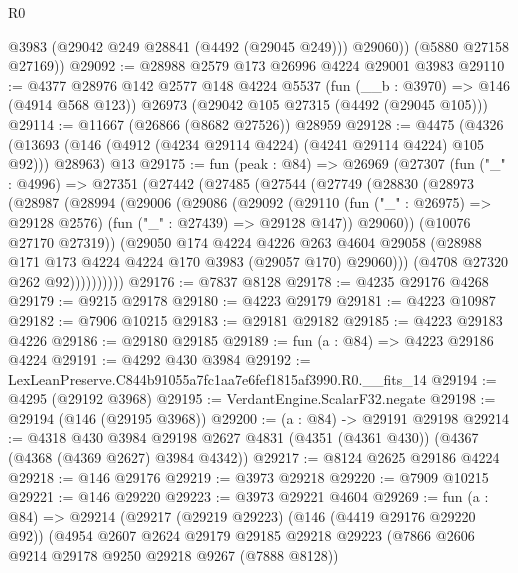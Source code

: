 \begin{lexlean}{R0}
\begin{coremodule}
          @3983
          (@29042 @249 @28841 (@4492 (@29045 @249)))
          @29060))
      (@5880 @27158 @27169))
@29092 := @28988 @2579 @173 @26996 @4224 @29001 @3983
@29110 := @4377
    @28976
    @142
    @2577
    @148
    @4224
    @5537
    (fun (__b : @3970) => @146 (@4914 @568 @123))
    @26973
    (@29042 @105 @27315 (@4492 (@29045 @105)))
@29114 := @11667 (@26866 (@8682 @27526)) @28959
@29128 := @4475
    (@4326 (@13693 (@146 (@4912 (@4234 @29114 @4224) (@4241 @29114 @4224) @105 @92))) @28963)
    @13
@29175 := fun (peak : @84) =>
  @26969
    (@27307
      (fun ("_" : @4996) =>
      @27351
        (@27442
          (@27485
            (@27544
              (@27749
                (@28830
                  (@28973
                    (@28987
                      (@28994
                        (@29006
                          (@29086
                            (@29092
                              (@29110
                                (fun ("_" : @26975) => @29128 @2576)
                                (fun ("_" : @27439) => @29128 @147))
                              @29060))
                          (@10076 @27170 @27319))
                        (@29050
                          @174
                          @4224
                          @4226
                          @263
                          @4604
                          @29058
                          (@28988 @171 @173 @4224 @4224 @170 @3983 (@29057 @170) @29060)))
                      (@4708 @27320 @262 @92))))))))))
@29176 := @7837 @8128
@29178 := @4235 @29176 @4268
@29179 := @9215 @29178
@29180 := @4223 @29179
@29181 := @4223 @10987
@29182 := @7906 @10215
@29183 := @29181 @29182
@29185 := @4223 @29183 @4226
@29186 := @29180 @29185
@29189 := fun (a : @84) => @4223 @29186 @4224
@29191 := @4292 @430 @3984
@29192 := LexLeanPreserve.C844b91055a7fc1aa7e6fef1815af3990.R0.__fits_14
@29194 := @4295 (@29192 @3968)
@29195 := VerdantEngine.ScalarF32.negate
@29198 := @29194 (@146 (@29195 @3968))
@29200 := (a : @84) -> @29191 @29198
@29214 := @4318
    @430
    @3984
    @29198
    @2627
    @4831
    (@4351 (@4361 @430))
    (@4367 (@4368 (@4369 @2627) @3984 @4342))
@29217 := @8124 @2625 @29186 @4224
@29218 := @146 @29176
@29219 := @3973 @29218
@29220 := @7909 @10215
@29221 := @146 @29220
@29223 := @3973 @29221 @4604
@29269 := fun (a : @84) =>
  @29214
    (@29217
      (@29219 @29223)
      (@146 (@4419 @29176 @29220 @92))
      (@4954
        @2607
        @2624
        @29179
        @29185
        @29218
        @29223
        (@7866 @2606 @9214 @29178 @9250 @29218 @9267 (@7888 @8128))

\end{coremodule}
\end{lexlean}
